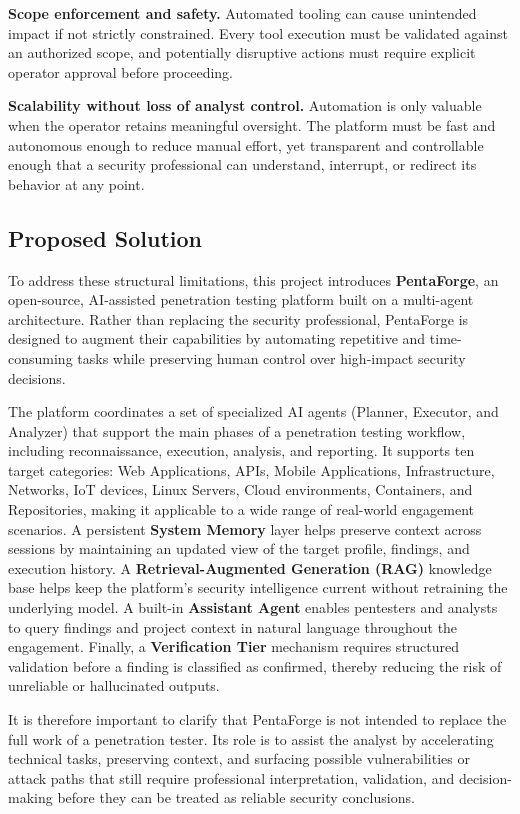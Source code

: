 \documentclass[12pt,a4paper]{report}
\begin{document}
\textbf{Scope enforcement and safety.} Automated tooling can cause unintended impact
if not strictly constrained. Every tool execution must be validated against an
authorized scope, and potentially disruptive actions must require explicit operator
approval before proceeding.

\textbf{Scalability without loss of analyst control.} Automation is only valuable
when the operator retains meaningful oversight. The platform must be fast and
autonomous enough to reduce manual effort, yet transparent and controllable enough
that a security professional can understand, interrupt, or redirect its behavior at
any point.

\subsection{Proposed Solution}

To address these structural limitations, this project introduces \textbf{PentaForge},
an open-source, AI-assisted penetration testing platform built on a multi-agent
architecture. Rather than replacing the security professional, PentaForge is designed
to augment their capabilities by automating repetitive and time-consuming tasks while
preserving human control over high-impact security decisions.

The platform coordinates a set of specialized AI agents (Planner, Executor,
and Analyzer) that support the main phases of a penetration testing workflow,
including reconnaissance, execution, analysis, and reporting. It supports ten
target categories: Web Applications, APIs, Mobile Applications, Infrastructure,
Networks, IoT devices, Linux Servers, Cloud environments, Containers, and
Repositories, making it applicable to a wide range of real-world engagement
scenarios. A persistent \textbf{System Memory} layer helps preserve context across sessions by maintaining an updated view of the target profile, findings, and execution history. A
\textbf{Retrieval-Augmented Generation (RAG)} knowledge base helps keep the
platform's security intelligence current without retraining the underlying model.
A built-in \textbf{Assistant Agent} enables pentesters and analysts to query
findings and project context in natural language throughout the engagement.
Finally, a \textbf{Verification Tier} mechanism requires structured validation
before a finding is classified as confirmed, thereby reducing the risk of unreliable
or hallucinated outputs.

It is therefore important to clarify that PentaForge is not intended to replace the
full work of a penetration tester. Its role is to assist the analyst by accelerating
technical tasks, preserving context, and surfacing possible vulnerabilities or attack
paths that still require professional interpretation, validation, and decision-making
before they can be treated as reliable security conclusions.
\end{document}
